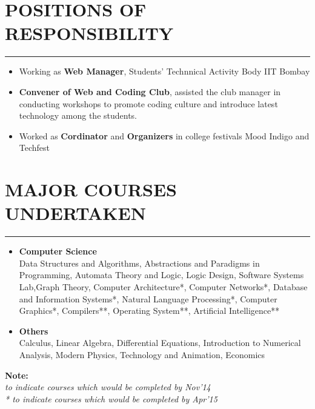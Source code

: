 \documentclass[11pt]{article} %
\begin{document}
\section*{POSITIONS OF RESPONSIBILITY}
\hrule
\medskip
\begin{itemize}
\itemsep-0.3em
\item Working as \textbf{Web Manager}, Students' Technnical Activity Body IIT Bombay
\item \textbf{Convener of Web and Coding Club}, assisted the club manager in conducting workshops to promote coding culture and
introduce latest technology among the students.
\item Worked as \textbf{Cordinator} and \textbf{Organizers} in college festivals Mood Indigo and Techfest
\end{itemize}
\vspace{-5mm}

\section*{MAJOR COURSES UNDERTAKEN}
\hrule
\medskip
\begin{itemize}
\itemsep -0.1em
\item
{\bf Computer Science}\\
Data Structures and Algorithms, Abstractions and Paradigms in Programming, Automata Theory and Logic, Logic Design, Software Systems Lab,Graph Theory, Computer Architecture*, Computer Networks*, Database and Information Systems*, Natural Language Processing*, Computer Graphics*, Compilers**, Operating System**, Artificial Intelligence** 

\item
{\bf Others}\\
Calculus, Linear Algebra, Differential Equations, Introduction to Numerical Analysis, Modern Physics, Technology and Animation, Economics\\
\end{itemize}
\vspace{-9mm}
{\bf Note: }\\{\em * to indicate courses which would be completed by Nov'14}
			\\{\em ** to indicate courses which would be completed by Apr'15}				
\vspace{-3mm}
\end{document}
